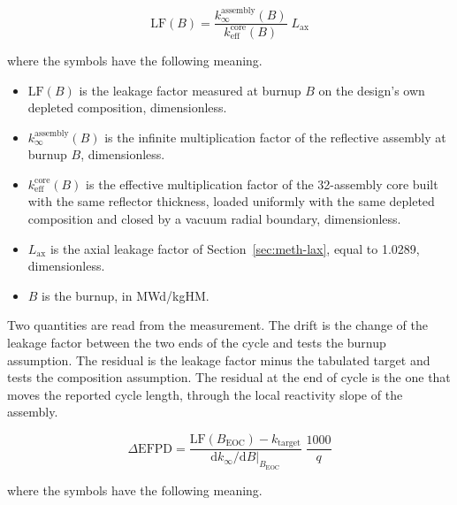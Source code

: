 \begin{equation}
\mathrm{LF}(B) =
\frac{k_\infty^\mathrm{assembly}(B)}{k_\mathrm{eff}^\mathrm{core}(B)}
\; L_\mathrm{ax}
\label{eq:kt-lf}
\end{equation}

\noindent where the symbols have the following meaning.

\begin{itemize}
  \item $\mathrm{LF}(B)$ is the leakage factor measured at burnup $B$
        on the design's own depleted composition, dimensionless.

  \item $k_\infty^\mathrm{assembly}(B)$ is the infinite multiplication
        factor of the reflective assembly at burnup $B$,
        dimensionless.

  \item $k_\mathrm{eff}^\mathrm{core}(B)$ is the effective
        multiplication factor of the \num{32}-assembly core built with
        the same reflector thickness, loaded uniformly with the same
        depleted composition and closed by a vacuum radial boundary,
        dimensionless.

  \item $L_\mathrm{ax}$ is the axial leakage factor of
        Section~\ref{sec:meth-lax}, equal to \num{1.0289},
        dimensionless.

  \item $B$ is the burnup, in MWd/kgHM.
\end{itemize}

Two quantities are read from the measurement. The drift is the change
of the leakage factor between the two ends of the cycle and tests the
burnup assumption. The residual is the leakage factor minus the
tabulated target and tests the composition assumption. The residual at
the end of cycle is the one that moves the reported cycle length,
through the local reactivity slope of the assembly.

\begin{equation}
\Delta\mathrm{EFPD} =
\frac{\mathrm{LF}(B_\mathrm{EOC}) - k_\mathrm{target}}
     {\left. \mathrm{d}k_\infty / \mathrm{d}B \right|_{B_\mathrm{EOC}}}
\; \frac{1000}{q}
\label{eq:kt-defpd}
\end{equation}

\noindent where the symbols have the following meaning.


